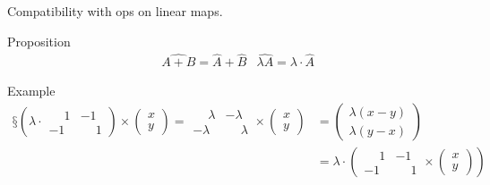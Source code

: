 \documentclass{beamer}
\begin{document}
\begin{frame}{Compatibility with ops on linear maps.}
  \begin{block}{Proposition}
    \[
    \begin{aligned}
      &\widehat{A + B} = \hat A + \hat B &\widehat{\lambda A} = \lambda \cdot \hat A
    \end{aligned}
    \]
  \end{block}

  \begin{exampleblock}{Example}
    \[\begin{aligned}
    §\left ( \lambda \cdot
    \begin{array}{|cc|}
      \phantom{-}1 &  -1 \\
      -1 & \phantom{-}1 
    \end{array} \right ) \times \left ( \begin{array}{c} x \\ y \end{array} \right ) = \begin{array}{|cc|}
      \phantom{-}\lambda &  -\lambda \\
      -\lambda & \phantom{-}\lambda
    \end{array} \times \left ( \begin{array}{c} x \\ y \end{array} \right ) &= \left ( \begin{array}{c} \lambda(x - y) \\ \lambda(y - x) \end{array} \right ) \\&=
    \lambda \cdot \left (
    \begin{array}{|cc|}
      \phantom{-}1 &  -1 \\
      -1 & \phantom{-}1 
    \end{array}
    \times \left ( \begin{array}{c} x \\ y \end{array} \right )  \right )
    \end{aligned}
    \]
  \end{exampleblock}
\end{frame}
\end{document}
